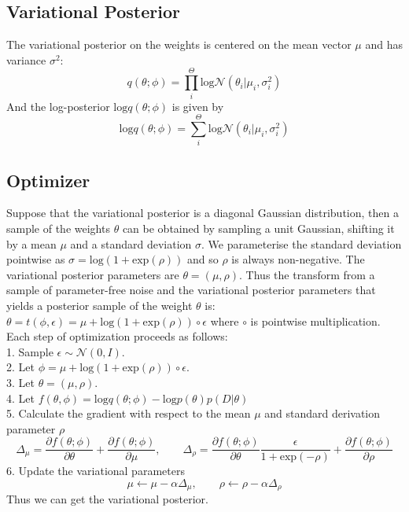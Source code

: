 \documentclass{article}
\begin{document}
	\subsection{Variational Posterior}
	\noindent The variational posterior on the weights is centered on the mean vector $\mu$ and has variance $\sigma^2$:
	\begin{equation}
	q(\theta;\phi) = \prod_{i}^{\Theta}\text{log}\mathcal{N}(\theta_i|\mu_i,\sigma_i^2)
	\end{equation}
	And the log-posterior $\text{log}q(\theta;\phi)$ is given by
	\begin{equation}
	\text{log}q(\theta;\phi) = \sum_{i}^{\Theta}\text{log}\mathcal{N}(\theta_i|\mu_i,\sigma_i^2)
	\end{equation}
	\subsection{Optimizer}
	Suppose that the variational posterior is a diagonal Gaussian distribution, then a sample of the weights $\theta$ can be obtained by sampling a unit Gaussian, shifting it by a mean  $\mu$ and a standard deviation $\sigma$. We parameterise the standard deviation pointwise as $\sigma = \text{log}(1+\text{exp}(\rho))$ and so $\rho$ is always non-negative. The variational posterior parameters are $\theta = (\mu,\rho).$ Thus the transform from a sample of parameter-free noise and the variational posterior parameters that yields a posterior sample of the weight $\theta$ is: $\theta = t(\phi,\epsilon) = \mu + \text{log}(1+\text{exp}(\rho))\circ\epsilon$ where $\circ$ is pointwise multiplication. Each step of optimization proceeds as follows:\\
	1. Sample $\epsilon \sim \mathcal{N}(0,I)$.\\
	2. Let $\phi = \mu + \text{log}(1+\text{exp}(\rho))\circ\epsilon$.\\
	3. Let $\theta = (\mu,\rho)$.\\
	4. Let $f(\theta,\phi) = \text{log}q(\theta;\phi)-\text{log}p(\theta)p(D|\theta)$\\
	5. Calculate the gradient with respect to the mean $\mu$ and standard derivation parameter $\rho$\\
	\begin{equation}
	\Delta_\mu = \frac{\partial f(\theta;\phi)}{\partial \theta} + \frac{\partial f(\theta;\phi)}{\partial \mu} ,\quad\quad\Delta_\rho = \frac{\partial f(\theta;\phi)}{\partial \theta}\frac{\epsilon}{1+\text{exp}(-\rho)} + \frac{\partial f(\theta;\phi)}{\partial \rho}
	\end{equation}
	6. Update the variational parameters
	\begin{equation}
	\mu \leftarrow \mu - \alpha\Delta_{\mu},\quad\quad\rho \leftarrow \rho - \alpha\Delta_{\rho} 
	\end{equation}
	\noindent Thus we can get the variational posterior.
\end{document}
